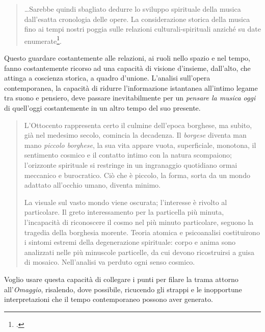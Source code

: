 \begin{quote}
		\raggedright
		\ldots Sarebbe quindi sbagliato dedurre lo sviluppo spirituale della musica dall'esatta cronologia delle opere. La considerazione storica della musica fino ai tempi nostri poggia sulle relazioni culturali-spirituali anziché su date enumerate\footcite[pag. 2 ]{fleischer:mcont}.
\end{quote}

Questo guardare costantemente alle relazioni, ai ruoli nello spazio e nel tempo, fanno costantemente ricorso ad una capacità di visione d'insieme, dall'alto, che attinga a coscienza storica, a quadro d'unione. L'analisi sull'opera contemporanea, la capacità di ridurre l'informazione istantanea all'intimo legame tra suono e pensiero, deve passare inevitabilmente per un \emph{pensare la musica oggi} di quell'oggi costantemente in un altro tempo del suo presente.

\begin{quote}
L'Ottocento rappresenta certo il culmine dell'epoca borghese, ma subito, già nel medesimo secolo, comincia la decadenza. Il \emph{borgese} diventa man mano \emph{piccolo borghese}, la sua vita appare vuota, superficiale, monotona, il sentimento cosmico e il contatto intimo con la natura scompaiono; l'orizzonte spirituale si restringe in un ingranaggio quotidiano ormai meccanico e burocratico. Ciò che è piccolo, la forma, sorta da un mondo adattato all'occhio umano, diventa minimo.

La visuale sul vasto mondo viene oscurata; l'interesse è rivolto al particolare. Il greto interessamento per la particella più minuta, l'incapacità di riconoscere il cosmo nel più minuto particolare, seguono la tragedia della borghesia morente. Teoria atomica e psicoanalisi costituirono i sintomi estremi della degenerazione spirituale: corpo e anima sono analizzati nelle più minuscole particelle, da cui devono ricostruirsi a guisa di mosaico. Nell'analisi va perduto ogni senso cosmico.
\end{quote}

Voglio usare questa capacità di collegare i punti per filare la trama attorno all'\emph{Omaggio}, risalendo, dove possibile, ricucendo gli strappi e le inopportune interpretazioni che il tempo contemporaneo possono aver generato.

